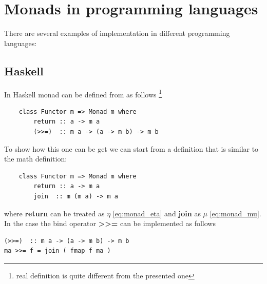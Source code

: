 
\section{Monads in programming languages}
There are several examples of  implementation in
different programming languages:

\subsection{Haskell}

\begin{example}
\label{ex:monad_haskell}
In Haskell monad can be defined from  as follows 
\footnote{real definition is quite different from the presented one}
\begin{verbatim}
    class Functor m => Monad m where
        return :: a -> m a
        (>>=)  :: m a -> (a -> m b) -> m b
\end{verbatim} 

To show how this one can be get we can start from a definition that is
similar to the math definition:
\begin{verbatim}
    class Functor m => Monad m where
        return :: a -> m a
        join  :: m (m a) -> m a
\end{verbatim} 
where \textbf{return} can be treated as $\eta$
\eqref{eq:monad_eta} and 
\textbf{join} as $\mu$ \eqref{eq:monad_mu}. In the case
the bind operator \textbf{>>=} can be implemented as follows
\begin{verbatim}
(>>=)  :: m a -> (a -> m b) -> m b
ma >>= f = join ( fmap f ma )
\end{verbatim} 
\end{example}

